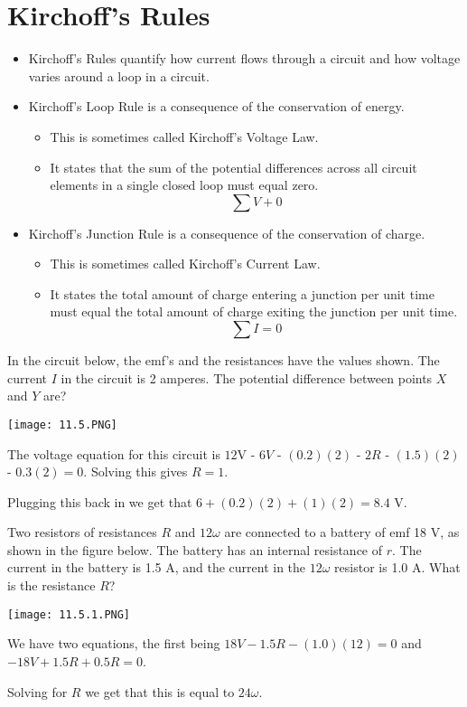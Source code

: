 \documentclass[../em.tex]{subfiles}
\begin{document}
\section{Kirchoff's Rules}
\begin{itemize}
    \item Kirchoff's Rules quantify how current flows through a circuit and how voltage varies around a loop in a circuit.
    \item Kirchoff's Loop Rule is a consequence of the conservation of energy.
    \begin{itemize}
        \item This is sometimes called Kirchoff's Voltage Law.
        \item It states that the sum of the potential differences across all circuit elements in a single closed loop must equal zero.
        \[\sum V + 0\]
    \end{itemize}
    \item Kirchoff's Junction Rule is a consequence of the conservation of charge.
    \begin{itemize}
        \item This is sometimes called Kirchoff's Current Law.
        \item It states the total amount of charge entering a junction per unit time must equal the total amount of charge exiting the junction per unit time.
        \[\sum I = 0\]
    \end{itemize}
\end{itemize}

\begin{example}
    In the circuit below, the emf's and the resistances have the values shown. The current $I$ in the circuit is 2 amperes. The potential difference between points $X$ and $Y$ are?

    \begin{center}
        \texttt{[image: 11.5.PNG]}
    \end{center}

    The voltage equation for this circuit is $12$V - $6V$ - $(0.2)(2)$ - $2R$ - $(1.5)(2)$ - $0.3(2) = 0$. Solving this gives $R=1$.

    Plugging this back in we get that $6+(0.2)(2)+(1)(2)=8.4$ V.
\end{example}

\begin{example}
    Two resistors of resistances $R$ and $12\omega$ are connected to a battery of emf 18 V, as shown in the figure below. The battery has an internal resistance of $r$. The current in the battery 
    is 1.5 A, and the current in the $12\omega$ resistor is 1.0 A. What is the resistance $R$?

    \begin{center}
        \texttt{[image: 11.5.1.PNG]}
    \end{center}

    We have two equations, the first being $18V-1.5R-(1.0)(12)=0$ and $-18V+1.5R+0.5R=0$.

    Solving for $R$ we get that this is equal to $24\omega$.
\end{example}
\end{document}
